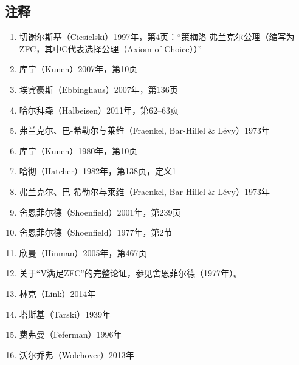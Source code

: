 \subsection{注释}
\begin{enumerate}
\item 切谢尔斯基（Ciesielski）1997年，第4页：“策梅洛-弗兰克尔公理（缩写为ZFC，其中C代表选择公理（Axiom of Choice））”
\item 库宁（Kunen）2007年，第10页
\item 埃宾豪斯（Ebbinghaus）2007年，第136页
\item 哈尔拜森（Halbeisen）2011年，第62–63页
\item 弗兰克尔、巴-希勒尔与莱维（Fraenkel, Bar-Hillel & Lévy）1973年
\item 库宁（Kunen）1980年，第10页
\item 哈彻（Hatcher）1982年，第138页，定义1
\item 弗兰克尔、巴-希勒尔与莱维（Fraenkel, Bar-Hillel & Lévy）1973年
\item 舍恩菲尔德（Shoenfield）2001年，第239页
\item 舍恩菲尔德（Shoenfield）1977年，第2节
\item 欣曼（Hinman）2005年，第467页
\item 关于“V满足ZFC”的完整论证，参见舍恩菲尔德（1977年）。
\item 林克（Link）2014年
\item 塔斯基（Tarski）1939年
\item 费弗曼（Feferman）1996年
\item 沃尔乔弗（Wolchover）2013年
\end{enumerate}
